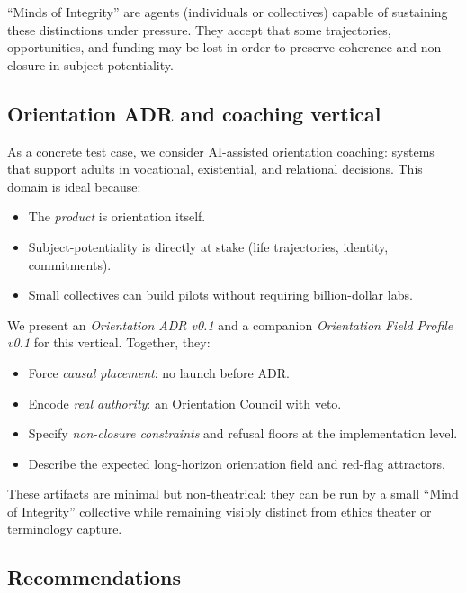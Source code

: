 \documentclass[11pt]{article}
\begin{document}
``Minds of Integrity'' are agents (individuals or collectives) capable of sustaining these distinctions under pressure. They accept that some trajectories, opportunities, and funding may be lost in order to preserve coherence and non-closure in subject-potentiality.

\subsection{Orientation ADR and coaching vertical}

As a concrete test case, we consider AI-assisted orientation coaching: systems that support adults in vocational, existential, and relational decisions. This domain is ideal because:

\begin{itemize}[nosep]
  \item The \emph{product} is orientation itself.
  \item Subject-potentiality is directly at stake (life trajectories, identity, commitments).
  \item Small collectives can build pilots without requiring billion-dollar labs.
\end{itemize}

We present an \emph{Orientation ADR v0.1} and a companion \emph{Orientation Field Profile v0.1} for this vertical. Together, they:

\begin{itemize}[nosep]
  \item Force \emph{causal placement}: no launch before ADR.
  \item Encode \emph{real authority}: an Orientation Council with veto.
  \item Specify \emph{non-closure constraints} and refusal floors at the implementation level.
  \item Describe the expected long-horizon orientation field and red-flag attractors.
\end{itemize}

These artifacts are minimal but non-theatrical: they can be run by a small ``Mind of Integrity'' collective while remaining visibly distinct from ethics theater or terminology capture.

\subsection{Recommendations}
\end{document}
